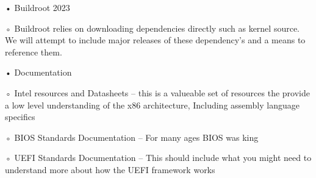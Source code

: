    • Buildroot 2023

        ◦ Buildroot relies on downloading dependencies directly such as kernel source. We will attempt to include major releases of these dependency's and a means to reference them.

    • Documentation

        ◦ Intel resources and Datasheets – this is a valueable set of resources the provide a low level understanding of the x86 architecture, Including assembly language specifics

        ◦ BIOS Standards Documentation – For many ages BIOS was king

        ◦ UEFI Standards Documentation – This should include what you might need to understand more about how the UEFI framework works
